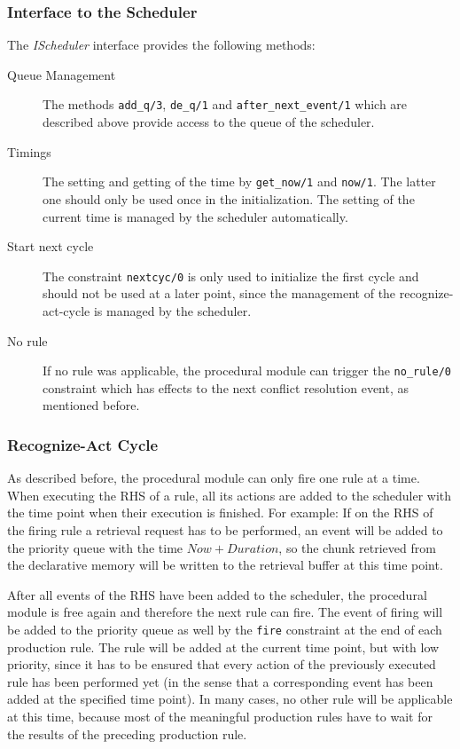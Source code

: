 \subsubsection{Interface to the Scheduler}

\begin{definition}[IScheduler]
\label{def:ischeduler}
The \emph{IScheduler} interface provides the following methods:

\begin{description}
 \item[Queue Management] The methods \lstinline|add_q/3|, \lstinline|de_q/1| and \lstinline|after_next_event/1| which are described above provide access to the queue of the scheduler.
 \item[Timings] The setting and getting of the time by \lstinline|get_now/1| and \lstinline|now/1|. The latter one should only be used once in the initialization. The setting of the current time is managed by the scheduler automatically.
 \item[Start next cycle] The constraint \lstinline|nextcyc/0| is only used to initialize the first cycle and should not be used at a later point, since the management of the recognize-act-cycle is managed by the scheduler. 
 \item[No rule] If no rule was applicable, the procedural module can trigger the \lstinline|no_rule/0| constraint which has effects to the next conflict resolution event, as mentioned before.
\end{description}
\end{definition}

\subsubsection{Recognize-Act Cycle}
\label{implementation:scheduler:recognize-act}

As described before, the procedural module can only fire one rule at a time. When executing the RHS of a rule, all its actions are added to the scheduler with the time point when their execution is finished. For example: If on the RHS of the firing rule a retrieval request has to be performed, an event will be added to the priority queue with the time $Now + Duration$, so the chunk retrieved from the declarative memory will be written to the retrieval buffer at this time point.

After all events of the RHS have been added to the scheduler, the procedural module is free again and therefore the next rule can fire. The event of firing will be added to the priority queue as well by the \lstinline|fire| constraint at the end of each production rule. The rule will be added at the current time point, but with low priority, since it has to be ensured that every action of the previously executed rule has been performed yet (in the sense that a corresponding event has been added at the specified time point). In many cases, no other rule will be applicable at this time, because most of the meaningful production rules have to wait for the results of the preceding production rule. 

